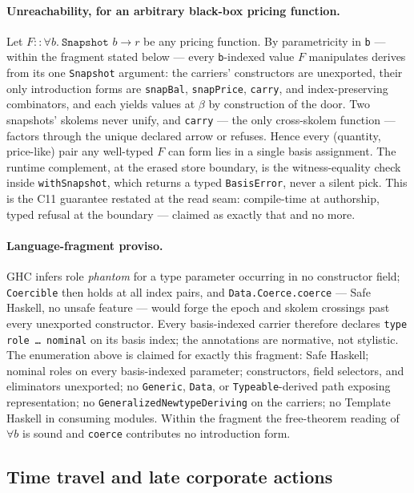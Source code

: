 \paragraph{Unreachability, for an arbitrary black-box pricing function.} Let
$F::\forall b.\ \texttt{Snapshot } b\to r$ be any pricing function. By parametricity in
\texttt{b} --- within the fragment stated below --- every \texttt{b}-indexed value $F$
manipulates derives from its one \texttt{Snapshot} argument: the carriers' constructors
are unexported, their only introduction forms are \texttt{snapBal}, \texttt{snapPrice},
\texttt{carry}, and index-preserving combinators, and each yields values at $\beta$ by
construction of the door. Two snapshots' skolems never unify, and \texttt{carry} --- the
only cross-skolem function --- factors through the unique declared arrow or refuses.
Hence every (quantity, price-like) pair any well-typed $F$ can form lies in a single
basis assignment. The runtime complement, at the erased store boundary, is the
witness-equality check inside \texttt{withSnapshot}, which returns a typed
\texttt{BasisError}, never a silent pick. This is the C11 guarantee restated at the read
seam: compile-time at authorship, typed refusal at the boundary --- claimed as exactly
that and no more.

\paragraph{Language-fragment proviso.} GHC infers role \emph{phantom} for a type
parameter occurring in no constructor field; \texttt{Coercible} then holds at all index
pairs, and \texttt{Data.Coerce.coerce} --- Safe Haskell, no unsafe feature --- would
forge the epoch and skolem crossings past every unexported constructor. Every
basis-indexed carrier therefore declares \texttt{type role \dots\ nominal} on its basis
index; the annotations are normative, not stylistic. The enumeration above is claimed
for exactly this fragment: Safe Haskell; nominal roles on every basis-indexed parameter;
constructors, field selectors, and eliminators unexported; no \texttt{Generic},
\texttt{Data}, or \texttt{Typeable}-derived path exposing representation; no
\texttt{GeneralizedNewtypeDeriving} on the carriers; no Template Haskell in consuming
modules. Within the fragment the free-theorem reading of $\forall b$ is sound and
\texttt{coerce} contributes no introduction form.

\subsection{Time travel and late corporate actions}
\label{sec:basis-time-travel}

